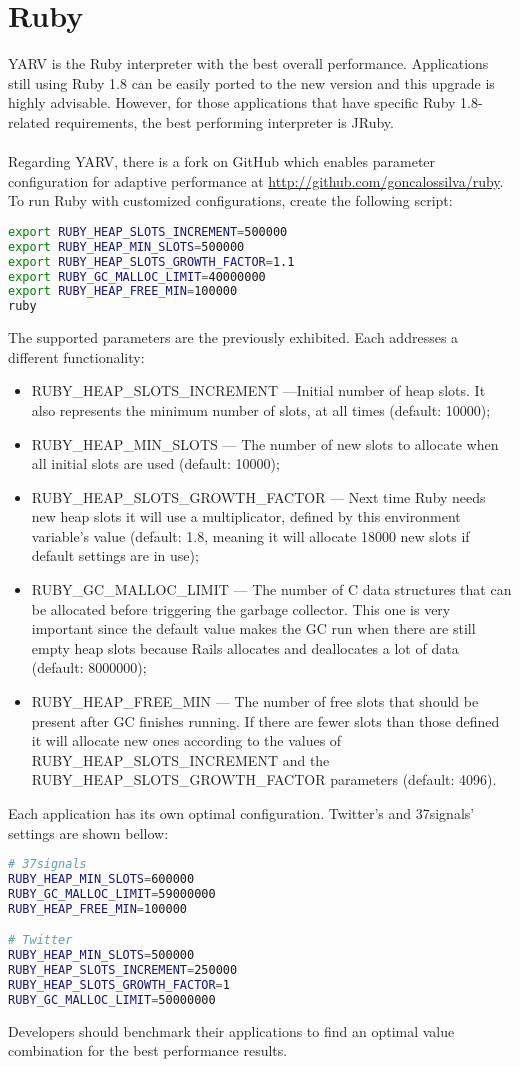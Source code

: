 \section{Ruby}
YARV is the Ruby interpreter with the best overall performance. Applications still using Ruby 1.8 can be easily ported to the new version and this upgrade is highly advisable. However, for those applications that have specific Ruby 1.8-related requirements, the best performing interpreter is JRuby.\\\\
Regarding YARV, there is a fork on GitHub which enables parameter configuration for adaptive performance at \url{http://github.com/goncalossilva/ruby}. To run Ruby with customized configurations, create the following script:
\begin{lstlisting}[language=bash]
export RUBY_HEAP_SLOTS_INCREMENT=500000
export RUBY_HEAP_MIN_SLOTS=500000
export RUBY_HEAP_SLOTS_GROWTH_FACTOR=1.1
export RUBY_GC_MALLOC_LIMIT=40000000
export RUBY_HEAP_FREE_MIN=100000
ruby
\end{lstlisting}
The supported parameters are the previously exhibited. Each addresses a different functionality:
\begin{itemize}
  \item RUBY\_HEAP\_SLOTS\_INCREMENT ---Initial number of heap slots. It also represents the minimum number of slots, at all times (default: 10000);
  \item RUBY\_HEAP\_MIN\_SLOTS --- The number of new slots to allocate when all initial slots are used (default: 10000);
  \item RUBY\_HEAP\_SLOTS\_GROWTH\_FACTOR --- Next time Ruby needs new heap slots it will use a multiplicator, defined by this environment variable’s value (default: 1.8, meaning it will allocate 18000 new slots if default settings are in use);
  \item RUBY\_GC\_MALLOC\_LIMIT --- The number of C data structures that can be allocated before triggering the garbage collector. This one is very important since the default value makes the GC run when there are still empty heap slots because Rails allocates and deallocates a lot of data (default: 8000000);
  \item RUBY\_HEAP\_FREE\_MIN --- The number of free slots that should be present after GC finishes running. If there are fewer slots than those defined it will allocate new ones according to the values of RUBY\_HEAP\_SLOTS\_INCREMENT and the RUBY\_HEAP\_SLOTS\_GROWTH\_FACTOR parameters (default: 4096).
\end{itemize}
Each application has its own optimal configuration. Twitter's and 37signals' settings are shown bellow:
\begin{lstlisting}[language=bash]
# 37signals
RUBY_HEAP_MIN_SLOTS=600000
RUBY_GC_MALLOC_LIMIT=59000000
RUBY_HEAP_FREE_MIN=100000

# Twitter
RUBY_HEAP_MIN_SLOTS=500000
RUBY_HEAP_SLOTS_INCREMENT=250000
RUBY_HEAP_SLOTS_GROWTH_FACTOR=1
RUBY_GC_MALLOC_LIMIT=50000000
\end{lstlisting}
Developers should benchmark their applications to find an optimal value combination for the best performance results.

